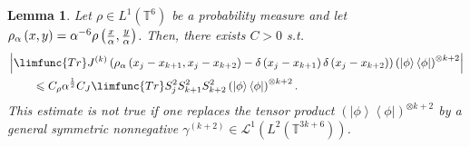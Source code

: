 \documentclass[12pt,letterpaper,leqno]{amsart}
\theoremstyle{plain}
\newtheorem{lemma}{Lemma}
\numberwithin{equation}{section}
\numberwithin{theorem}{section}
\numberwithin{proposition}{section}
\numberwithin{lemma}{section}
\numberwithin{corollary}{section}
\begin{document}
\begin{lemma}
\label{lem:approximation of identity for products}Let $\rho \in L^{1}\left( 
\mathbb{T}^{6}\right) $ be a probability measure and let $\rho _{\alpha
}\left( x,y\right) =\alpha ^{-6}\rho \left( \frac{x}{\alpha },\frac{y}{%
\alpha }\right) $. Then, there exists $C>0$ s.t. 
\begin{align*}
\hspace{0.3in}& \hspace{-0.3in}\left\vert \limfunc{Tr}J^{(k)}\left( \rho
_{\alpha }\left( x_{j}-x_{k+1},x_{j}-x_{k+2}\right) -\delta \left(
x_{j}-x_{k+1}\right) \delta \left( x_{j}-x_{k+2}\right) \right) \left(
\left\vert \phi \right\rangle \left\langle \phi \right\vert \right)
^{\otimes k+2}\right\vert \\
& \leqslant C_{\rho }\alpha ^{\frac{1}{2}}C_{J}\limfunc{Tr}%
S_{j}^{2}S_{k+1}^{2}S_{k+2}^{2}\left( \left\vert \phi \right\rangle
\left\langle \phi \right\vert \right) ^{\otimes k+2}.
\end{align*}%
This estimate is not true if one replaces the tensor product $\left(
\left\vert \phi \right\rangle \left\langle \phi \right\vert \right)
^{\otimes k+2}$ by a general symmetric nonnegative $\gamma ^{(k+2)}\in 
\mathcal{L}^{1}\left( L^{2}\left( \mathbb{T}^{3k+6}\right) \right) $.
\end{lemma}
\end{document}

